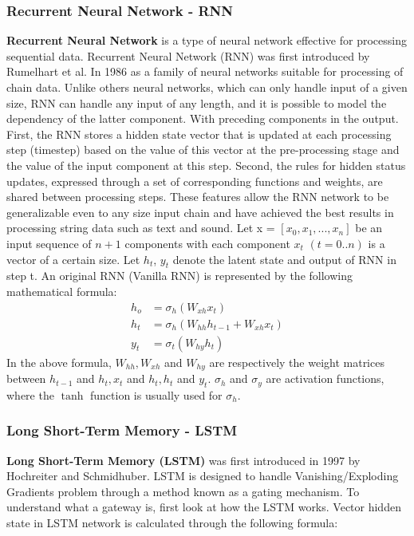 \subsubsection{Recurrent Neural Network - RNN}
\textbf{Recurrent Neural Network} is a type of neural network effective for processing sequential data. Recurrent Neural Network (RNN) was first introduced by Rumelhart et al. In 1986 \cite{Rumelhart:1986:PDP:104279} as a family of neural networks suitable for processing of chain data. Unlike others neural networks, which can only handle input of a given size, RNN can handle any input of any length, and it is possible to model the dependency of the latter component. With preceding components in the output. First, the RNN stores a hidden state vector that is updated at each processing step (timestep) based on the value of this vector at the pre-processing stage and the value of the input component at this step. Second, the rules for hidden status updates, expressed through a set of corresponding functions and weights, are shared between processing steps. These features allow the RNN network to be generalizable even to any size input chain and have achieved the best results in processing string data such as text and sound.
Let x = $[x_{0}, x_{1}, ..., x_{n}]$ be an input sequence of $n + 1$ components with each component $x_{t}$ $(t = 0..n)$ is a vector of a certain size. Let $h_{t}$, $y_{t}$ denote the latent state and output of RNN in step t. An original RNN (Vanilla RNN) is represented by the following mathematical formula:
\begin{align}
h_{o} &= \sigma_{h}(W_{xh}x_{t})\\
h_{t} &= \sigma_{h}(W_{hh}h_{t-1} + W_{xh}x_{t})\\
y_{t} &= \sigma_{t}(W_{hy}h_{t})
\end{align}
In the above formula, $W_{hh}, W_{xh}$ and $W_{hy}$ are respectively the weight matrices between $h_{t-1}$ and $h_{t}, x_{t}$ and $h_{t}, h_{t}$ and $y_{t}$. $\sigma_{h}$ and $\sigma_{y}$ are activation functions, where the $\tanh$ function is usually used for $\sigma_{h}$.
\subsubsection{Long Short-Term Memory - LSTM}

\textbf{Long Short-Term Memory (LSTM)} was first introduced in 1997 by Hochreiter and Schmidhuber. LSTM is designed to handle Vanishing/Exploding Gradients problem through a method known as a gating mechanism. To understand what a gateway is, first look at how the LSTM works. Vector hidden state in LSTM network is calculated through the following formula:

